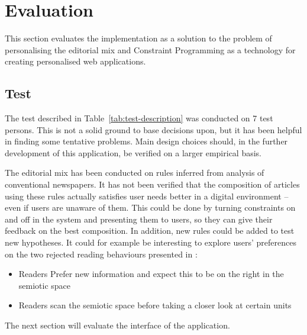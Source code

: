 \chapter{Evaluation} %
\label{ch:evaluation}
This section evaluates the implementation as a solution to the problem of personalising the editorial mix and Constraint Programming as a technology for creating personalised web applications.
%

\section{Test}
The test described in Table~\vref{tab:test-description} was conducted on 7 test persons. This is not a solid ground to base decisions upon, but it has been helpful in finding some tentative problems. Main design choices should, in the further development of this application, be verified on a larger empirical basis.

The editorial mix has been conducted on rules inferred from analysis of conventional newspapers. It has not been verified that the composition of articles using these rules actually satisfies user needs better in a digital environment -- even if users are unaware of them. This could be done by turning constraints on and off in the system and presenting them to users, so they can give their feedback on the best composition. In addition, new rules could be added to test new hypotheses. It could for example be interesting to explore users' preferences on the two rejected reading behaviours presented in \cite{holsanova2006entry}:
\begin{itemize}\itemdist
	\item Readers Prefer new information and expect this to be on the right in the semiotic space
	\item Readers scan the semiotic space before taking a closer look at certain units
\end{itemize}

The next section will evaluate the interface of the application.
%

